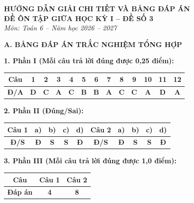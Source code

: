 \documentclass[12pt,a4paper]{article}
\begin{document}
\begin{center}
  \textbf{\Large HƯỚNG DẪN GIẢI CHI TIẾT VÀ BẢNG ĐÁP ÁN}\\
  \textbf{\large ĐỀ ÔN TẬP GIỮA HỌC KỲ I -- ĐỀ SỐ 3}\\
  \textit{Môn: Toán 6 -- Năm học 2026 -- 2027}
\end{center}
\vspace{2mm}

\noindent\textbf{\large A. BẢNG ĐÁP ÁN TRẮC NGHIỆM TỔNG HỢP}
\vspace{1.5mm}

\noindent\textbf{1. Phần I (Mỗi câu trả lời đúng được 0,25 điểm):}
\begin{center}
\begin{tabular}{|c|c|c|c|c|c|c|c|c|c|c|c|c|}
\hline
\textbf{Câu} & \textbf{1} & \textbf{2} & \textbf{3} & \textbf{4} & \textbf{5} & \textbf{6} & \textbf{7} & \textbf{8} & \textbf{9} & \textbf{10} & \textbf{11} & \textbf{12} \\
\hline
\textbf{Đ/A} & \textbf{D} & \textbf{C} & \textbf{A} & \textbf{C} & \textbf{B} & \textbf{B} & \textbf{A} & \textbf{C} & \textbf{C} & \textbf{A} & \textbf{D} & \textbf{A} \\
\hline
\end{tabular}
\end{center}
\vspace{1mm}

\noindent\textbf{2. Phần II (Đúng/Sai):}
\begin{center}
\begin{tabular}{|c|c|c|c|c||c|c|c|c|c|}
\hline
\textbf{Câu 1} & \textbf{a)} & \textbf{b)} & \textbf{c)} & \textbf{d)} & \textbf{Câu 2} & \textbf{a)} & \textbf{b)} & \textbf{c)} & \textbf{d)} \\
\hline
\textbf{Đ/S} & \textbf{Đ} & \textbf{S} & \textbf{S} & \textbf{Đ} & \textbf{Đ/S} & \textbf{Đ} & \textbf{S} & \textbf{S} & \textbf{Đ} \\
\hline
\end{tabular}
\end{center}
\vspace{1mm}

\noindent\textbf{3. Phần III (Mỗi câu trả lời đúng được 1,0 điểm):}
\begin{center}
\begin{tabular}{|c|c|c|}
\hline
\textbf{Câu} & \textbf{Câu 1} & \textbf{Câu 2} \\
\hline
\textbf{Đáp án} & \textbf{4} & \textbf{8} \\
\hline
\end{tabular}
\end{center}
\vspace{3mm}
\end{document}
